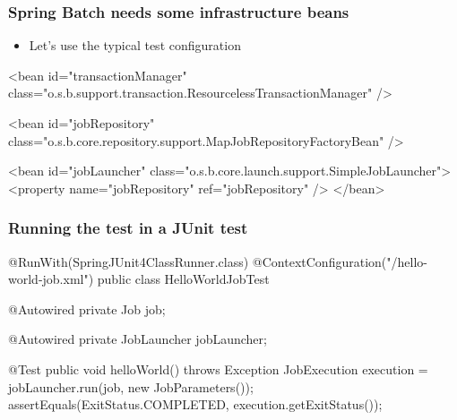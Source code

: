 \begin{frame}[fragile]
\frametitle{Spring Batch needs some infrastructure beans}
\begin{itemize}
 \item Let's use the typical test configuration
\end{itemize}

\begin{xmlcode}
<bean id="transactionManager"
      class="o.s.b.support.transaction.ResourcelessTransactionManager"
      />

<bean id="jobRepository"   
      class="o.s.b.core.repository.support.MapJobRepositoryFactoryBean" 
      />

<bean id="jobLauncher"
      class="o.s.b.core.launch.support.SimpleJobLauncher">
  <property name="jobRepository" ref="jobRepository" />
</bean>
\end{xmlcode}
\end{frame}

\begin{frame}[fragile]
\frametitle{Running the test in a JUnit test}

\begin{javacode}
@RunWith(SpringJUnit4ClassRunner.class)
@ContextConfiguration("/hello-world-job.xml")
public class HelloWorldJobTest {

  @Autowired
  private Job job;

  @Autowired
  private JobLauncher jobLauncher;

  @Test public void helloWorld() throws Exception {
    JobExecution execution = jobLauncher.run(job, new JobParameters());
    assertEquals(ExitStatus.COMPLETED, execution.getExitStatus());
  }
}
\end{javacode}
\end{frame}
